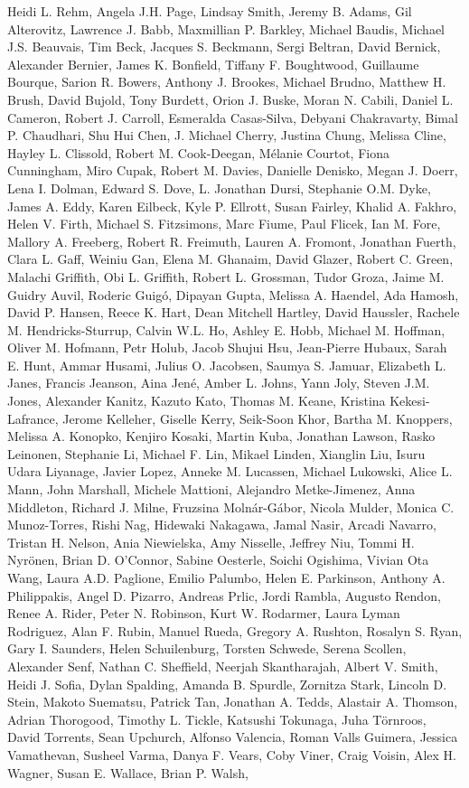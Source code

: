 \documentclass[10pt,letterpaper]{article}
\begin{document}
\begin{thebibliography}{10}
\begin{small}
Heidi L. Rehm, Angela J.H. Page, Lindsay Smith, Jeremy B. Adams, Gil Alterovitz, Lawrence J. Babb, Maxmillian P. Barkley, Michael Baudis, Michael J.S. Beauvais, Tim Beck, Jacques S. Beckmann, Sergi Beltran, David Bernick, Alexander Bernier, James K. Bonfield, Tiffany F. Boughtwood, Guillaume Bourque, Sarion R. Bowers, Anthony J. Brookes, Michael Brudno, Matthew H. Brush, David Bujold, Tony Burdett, Orion J. Buske, Moran N. Cabili, Daniel L. Cameron, Robert J. Carroll, Esmeralda Casas-Silva, Debyani Chakravarty, Bimal P. Chaudhari, Shu Hui Chen, J. Michael Cherry, Justina Chung, Melissa Cline, Hayley L. Clissold, Robert M. Cook-Deegan, Mélanie Courtot, Fiona Cunningham, Miro Cupak, Robert M. Davies, Danielle Denisko, Megan J. Doerr, Lena I. Dolman, Edward S. Dove, L. Jonathan Dursi, Stephanie O.M. Dyke, James A. Eddy, Karen Eilbeck, Kyle P. Ellrott, Susan Fairley, Khalid A. Fakhro, Helen V. Firth, Michael S. Fitzsimons, Marc Fiume, Paul Flicek, Ian M. Fore, Mallory A. Freeberg, Robert R. Freimuth, Lauren A. Fromont, Jonathan Fuerth, Clara L. Gaff, Weiniu Gan, Elena M. Ghanaim, David Glazer, Robert C. Green, Malachi Griffith, Obi L. Griffith, Robert L. Grossman, Tudor Groza, Jaime M. Guidry Auvil, Roderic Guigó, Dipayan Gupta, Melissa A. Haendel, Ada Hamosh, David P. Hansen, Reece K. Hart, Dean Mitchell Hartley, David Haussler, Rachele M. Hendricks-Sturrup, Calvin W.L. Ho, Ashley E. Hobb, Michael M. Hoffman, Oliver M. Hofmann, Petr Holub, Jacob Shujui Hsu, Jean-Pierre Hubaux, Sarah E. Hunt, Ammar Husami, Julius O. Jacobsen, Saumya S. Jamuar, Elizabeth L. Janes, Francis Jeanson, Aina Jené, Amber L. Johns, Yann Joly, Steven J.M. Jones, Alexander Kanitz, Kazuto Kato, Thomas M. Keane, Kristina Kekesi-Lafrance, Jerome Kelleher, Giselle Kerry, Seik-Soon Khor, Bartha M. Knoppers, Melissa A. Konopko, Kenjiro Kosaki, Martin Kuba, Jonathan Lawson, Rasko Leinonen, Stephanie Li, Michael F. Lin, Mikael Linden, Xianglin Liu, Isuru Udara Liyanage, Javier Lopez, Anneke M. Lucassen, Michael Lukowski, Alice L. Mann, John Marshall, Michele Mattioni, Alejandro Metke-Jimenez, Anna Middleton, Richard J. Milne, Fruzsina Molnár-Gábor, Nicola Mulder, Monica C. Munoz-Torres, Rishi Nag, Hidewaki Nakagawa, Jamal Nasir, Arcadi Navarro, Tristan H. Nelson, Ania Niewielska, Amy Nisselle, Jeffrey Niu, Tommi H. Nyrönen, Brian D. O’Connor, Sabine Oesterle, Soichi Ogishima, Vivian Ota Wang, Laura A.D. Paglione, Emilio Palumbo, Helen E. Parkinson, Anthony A. Philippakis, Angel D. Pizarro, Andreas Prlic, Jordi Rambla, Augusto Rendon, Renee A. Rider, Peter N. Robinson, Kurt W. Rodarmer, Laura Lyman Rodriguez, Alan F. Rubin, Manuel Rueda, Gregory A. Rushton, Rosalyn S. Ryan, Gary I. Saunders, Helen Schuilenburg, Torsten Schwede, Serena Scollen, Alexander Senf, Nathan C. Sheffield, Neerjah Skantharajah, Albert V. Smith, Heidi J. Sofia, Dylan Spalding, Amanda B. Spurdle, Zornitza Stark, Lincoln D. Stein, Makoto Suematsu, Patrick Tan, Jonathan A. Tedds, Alastair A. Thomson, Adrian Thorogood, Timothy L. Tickle, Katsushi Tokunaga, Juha Törnroos, David Torrents, Sean Upchurch, Alfonso Valencia, Roman Valls Guimera, Jessica Vamathevan, Susheel Varma, Danya F. Vears, Coby Viner, Craig Voisin, Alex H. Wagner, Susan E. Wallace, Brian P. Walsh, 
\end{small}
\end{thebibliography}
\end{document}

